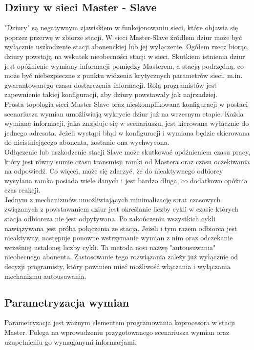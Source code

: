 \documentclass[a4paper,twoside]{article}
\begin{document}
\subsection{Dziury w sieci Master - Slave}
\label{subsec:dziury}
"Dziury" są negatywnym zjawiskiem w funkcjonowaniu sieci, które objawia się poprzez przerwę w zbiorze stacji. W sieci Master-Slave źródłem dziur może być wyłącznie uszkodzenie stacji abonenckiej lub jej wyłączenie. Ogółem rzecz biorąc, dziury powstają na wskutek nieobecności stacji w sieci. Skutkiem istnienia dziur jest opóźnienie wymiany informacji pomiędzy Masterem, a stacją podrzędną, co może być niebezpieczne z punktu widzenia krytycznych parametrów sieci, m.in. gwarantowanego czasu dostarczenia informacji. Rolą programistów jest zapewnienie takiej konfiguracji, aby dziury powstawały jak najrzadziej.\\
Prosta topologia sieci Master-Slave oraz nieskomplikowana konfiguracji w postaci scenariusza wymian umożliwiają wykrycie dziur już na wczesnym etapie. Każda wymiana informacji, jaka znajduje się w scenariuszu, jest kierowana wyłącznie do jednego adresata. Jeżeli wystąpi błąd w konfiguracji i wymiana będzie skierowana do nieistniejącego abonenta, zostanie ona wychwycona.\\
Odłączenie lub uszkodzenie stacji Slave może skutkować opóźnieniem czasu pracy, który jest równy sumie czasu transmisji ramki od Mastera oraz czasu oczekiwania na odpowiedź. Co więcej, może się zdarzyć, że do nieaktywnego odbiorcy wysyłana ramka posiada wiele danych i jest bardzo długa, co dodatkowo opóźnia czas reakcji.\\
Jednym z mechanizmów umożliwiających minimalizację strat czasowych związanych z powstawaniem dziur jest określanie liczby cykli w czasie których stacja odbiorcza nie jest odpytywana. Po zakończeniu wszystkich cykli nawiązywana jest próba połączenia ze stacją. Jeżeli i tym razem odbiorca jest nieaktywny, następuje ponowne wstrzymanie wymian z nim oraz odczekanie wcześniej ustalonej liczby cykli. Ta metoda nosi nazwę "autousuwania" nieobecnego abonenta. Zastosowanie tego rozwiązania zależy już wyłącznie od decyzji programisty, który powinien mieć możliwość włączania i wyłączania mechanizmu autousuwania.

\subsection{Parametryzacja wymian}
Parametryzacja jest ważnym elementem programowania koprocesora w stacji Master. Polega na wprowadzeniu przygotowanego scenariusza wymian oraz uzupełnieniu go wymaganymi informacjami.
\end{document}
